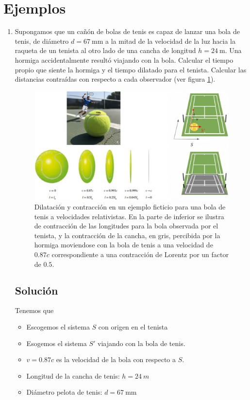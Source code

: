 \documentclass[11pt,a4paper]{article}
\begin{document}
\section{Ejemplos}
\begin{enumerate}
\item Supongamos que un cañón de bolas de tenis es capaz de lanzar una bola de tenis, de diámetro $d = \qty{67}{\milli\m}$  a la mitad de la velocidad de la luz hacia la raqueta de un tenista al otro lado de una cancha de longitud $h=\qty{24}{\m}$. Una hormiga accidentalmente resultó viajando con la bola. Calcular el tiempo propio que siente la hormiga y el tiempo dilatado para el tenista. Calcular las distancias contraídas con respecto a cada observador (ver figura \ref{fig:dilcon}). 

\begin{figure}
    \centering
    \includegraphics[width=1\linewidth]{tennis.png}
    \caption{Dilatación y contracción en un ejemplo ficticio para una bola de tenis a velocidades relativistas. En la parte de inferior se ilustra de contracción de las longitudes para la bola observada por el tenista, y la contracción de la cancha, en gris, percibida por la hormiga moviendose con la bola de tenis a una velocidad de $0.87c$ correspondiente a una contracción de Lorentz por un factor de $0.5$.}
    \label{fig:dilcon}
\end{figure}

\subsection*{Solución}
Tenemos que
\begin{itemize}
\item Escogemos el sistema $S$ con origen en el tenista
\item  Esogemos el sistema $S'$ viajando con la bola de tenis.
\item $v = 0.87c$ es la velocidad de la bola con respecto a $S$.
\item Longitud de la cancha de tenis: $h = \qty{24}{m}$ 
\item Diámetro pelota de tenis:  $d = \qty{67}{\milli\m}$
\end{itemize}


\end{enumerate}
\end{document}
